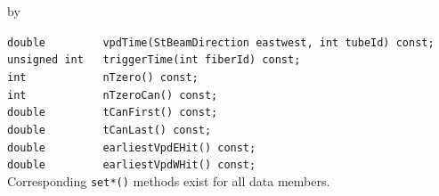 \documentclass[twoside]{article}
\newcommand{\entrylabel}[1]{\mbox{\textbf{{#1}}}\hfil}%
\newenvironment{entry}
{\begin{list}{}%
    {\renewcommand{\makelabel}{\entrylabel}%
     \setlength{\labelwidth}{90pt}%
     \setlength{\leftmargin}{\labelwidth}
     \advance\leftmargin by \labelsep%
      }%
    }%
  {\end{list}}
\newcommand{\Entrylabel}[1]%
{\raisebox{0pt}[1ex][0pt]{\makebox[\labelwidth][l]%
    {\parbox[t]{\labelwidth}{\hspace{0pt}\textbf{{#1}}}}}}
\newenvironment{Entry}%
{\renewcommand{\entrylabel}{\Entrylabel}\begin{entry}}%
  {\end{entry}}
\begin{document}
\begin{Entry}
    \verb+double         vpdTime(StBeamDirection eastwest, int tubeId) const;+\\
    \verb+unsigned int   triggerTime(int fiberId) const;+\\
    \verb+int            nTzero() const;+\\
    \verb+int            nTzeroCan() const;+\\
    \verb+double         tCanFirst() const;+\\
    \verb+double         tCanLast() const;+\\
    \verb+double         earliestVpdEHit() const;+\\
    \verb+double         earliestVpdWHit() const;+\\
    Corresponding \verb+set*()+ methods exist for all data members.
\end{Entry}
\clearpage
\end{document}
